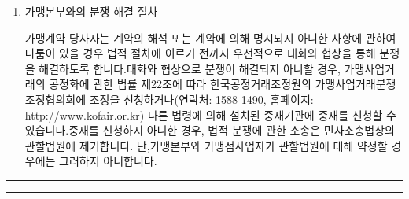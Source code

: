 \documentclass[a5paper,10pt]{oblivoir}
\newcommand\crule[3][black]{\textcolor{#1}{\rule{#2}{#3}}}
\begin{document}
\begin{enumerate}
\newpage
\begin{center}
\crule[red]{4cm}{0.1cm} \crule[blue]{4cm}{0.1cm}
\end{center}
\item 가맹본부와의 분쟁 해결 절차

가맹계약 당사자는 계약의 해석 또는 계약에 의해 명시되지 아니한 사항에 관하여 다툼이 있을 경우 법적 절차에 이르기 전까지 우선적으로 대화와 협상을 통해 분쟁을 해결하도록 합니다.대화와 협상으로 분쟁이 해결되지 아니할 경우, 가맹사업거래의 공정화에 관한 법률 제22조에 따라 한국공정거래조정원의 가맹사업거래분쟁조정협의회에 조정을 신청하거나(연락처: 1588-1490, 홈페이지: \\http://www.kofair.or.kr) 다른 법령에 의해 설치된 중재기관에 중재를 신청할 수 있습니다.중재를 신청하지 아니한 경우, 법적 분쟁에 관한 소송은 민사소송법상의 관할법원에 제기합니다. 단,가맹본부와 가맹점사업자가 관할법원에 대해 약정할 경우에는 그러하지 아니합니다.
\end{enumerate}

\newpage
\begin{center}
\crule[red]{4cm}{0.1cm} \crule[blue]{4cm}{0.1cm}
\end{center}
\end{document}
